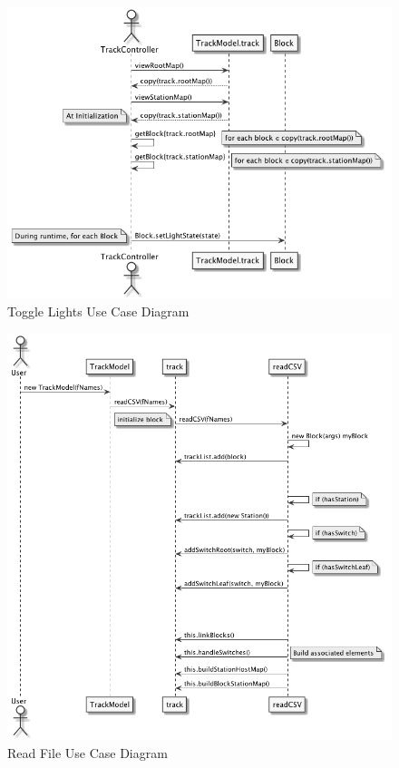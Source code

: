 \documentclass[]{article}
\begin{document}
\begin{figure}[H]
	\centering
	\includegraphics[scale=.3]{lights.png}
	\caption{Toggle Lights Use Case Diagram}
\end{figure}

\begin{figure}[H]
	\centering
	\includegraphics[scale=.3]{readFile.png}
	\caption{Read File Use Case Diagram}
\end{figure}
\end{document}
